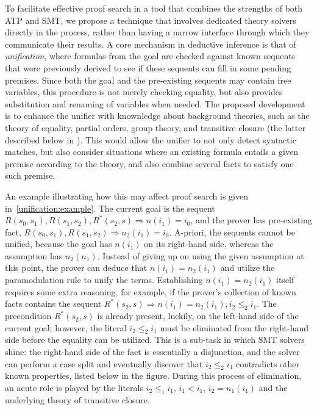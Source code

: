 To facilitate effective proof search in a tool that combines the strengths of both ATP and SMT,
we propose a technique that involves dedicated theory solvers directly in the process, rather than having a narrow interface through which they communicate their results.
A core mechanism in deductive inference is that of \emph{unification}, where formulas from the goal are checked against known sequents that were previously derived to see if these sequents can fill in some pending premises.
Since both the goal and the pre-existing sequents may contain free variables, this procedure is not merely checking equality, but also provides substitution and renaming of variables when needed.
The proposed development is to enhance the unifier with knownledge about background theories, such as the theory of equality, partial orders, group theory, and transitive closure (the latter described below in \todo{}).
This would allow the unifier to not only detect syntactic matches, but also consider situations where an existing formula entails a given premise according to the theory,
and also combine several facts to satisfy one such premise.

An example illustrating how this may affect proof search is given in~\autoref{unification:example}.
The current goal is the sequent
$R(s_0,s_1), R(s_1,s_2),R^*(s_2,s) \Rightarrow
n(i_1) = i_0$,
and the prover has pre-existing fact,
$R(s_0,s_1), R(s_1,s_2) \Rightarrow n_2(i_1)=i_0$.
A-priori, the sequents cannot be unified, because the goal has $n(i_1)$ on its right-hand side, whereas the assumption has $n_2(n_1)$.
Instead of giving up on using the given assumption at this point, the prover can deduce that $n(i_1)=n_2(i_1)$ and utilize the paramodulation rule to unify the terms.
Establishing $n(i_1)=n_2(i_1)$ itself requires some extra reasoning, for example, if the prover's collection of known facts contains the sequent
$R^*(s_2,s)\Rightarrow n(i_1)=n_2(i_1), i_2\leq_2 i_1$.
The precondition $R^*(s_2,s)$ is already present, luckily, on the left-hand side of the current goal;
however, the literal $i_2\leq_2 i_1$ must be eliminated from the right-hand side before the equality can be utilized.
This is a sub-task in which SMT solvers shine:
the right-hand side of the fact is essentially a disjunction, and the solver can perform a case split and eventually discover that $i_2\leq_2 i_1$ contradicts other known properties, listed below in the figure.
During this process of elimination, an acute role is played by the literals $i_2\leq_1 i_1$, $i_1<i_1$, $i_2=n_1(i_1)$ and the underlying theory of transitive closure.